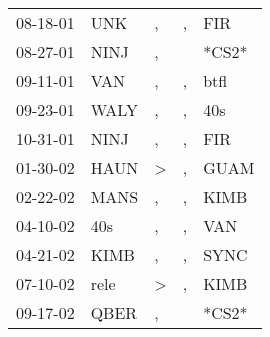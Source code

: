 \begin{supertabular}{lllll}
 08-18-01 &   UNK &             , &  , &    FIR \\
 08-27-01 &  NINJ &             , &    &  *CS2* \\
 09-11-01 &   VAN &             , &  , &   btfl \\
 09-23-01 &  WALY &             , &  , &    40s \\
 10-31-01 &  NINJ &             , &  , &    FIR \\
 01-30-02 &  HAUN &  \textgreater &  , &   GUAM \\
 02-22-02 &  MANS &             , &  , &   KIMB \\
 04-10-02 &   40s &             , &  , &    VAN \\
 04-21-02 &  KIMB &             , &  , &   SYNC \\
 07-10-02 &  rele &  \textgreater &  , &   KIMB \\
 09-17-02 &  QBER &             , &    &  *CS2* \\
\end{supertabular}
